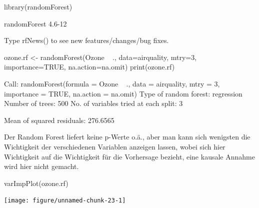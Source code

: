 \documentclass[a4paper,twoside]{tufte-book}\usepackage[]{graphicx}\usepackage[]{color}
\begin{document}
\begin{Schunk}
\begin{Sinput}
library(randomForest)
\end{Sinput}
\begin{Soutput}
randomForest 4.6-12
\end{Soutput}
\begin{Soutput}
Type rfNews() to see new features/changes/bug fixes.
\end{Soutput}
\begin{Sinput}
ozone.rf <- randomForest(Ozone ~ ., data=airquality, mtry=3,
                         importance=TRUE, na.action=na.omit)
print(ozone.rf)
\end{Sinput}
\begin{Soutput}

Call:
 randomForest(formula = Ozone ~ ., data = airquality, mtry = 3,      importance = TRUE, na.action = na.omit) 
               Type of random forest: regression
                     Number of trees: 500
No. of variables tried at each split: 3

          Mean of squared residuals: 276.6565
\end{Soutput}
\end{Schunk}

Der Random Forest liefert keine p-Werte o.ä., aber man kann sich wenigsten die Wichtigkeit der verschiedenen Variablen anzeigen lassen, wobei sich hier Wichtigkeit auf die Wichtigkeit für die Vorhersage bezieht, eine kausale Annahme wird hier nicht gemacht. 

\begin{Schunk}
\begin{Sinput}
varImpPlot(ozone.rf)
\end{Sinput}

\texttt{[image: figure/unnamed-chunk-23-1]} \end{Schunk}
\end{document}
